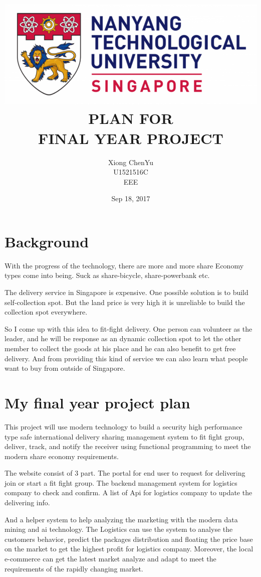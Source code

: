 \documentclass[setspace, doublespace]{scrartcl}
\author{Xiong ChenYu \\
U1521516C \\
EEE \\
}
\date{Sep 18, 2017 \\
}
\title{\includegraphics[width=\textwidth]{img/NTU.png} \\
[3\baselineskip] PLAN FOR\\
FINAL YEAR PROJECT \\
[6\baselineskip]}
\begin{document}
\maketitle
\tableofcontents

\listoffigures

\usepackage{indentfirst}
\newpage
\section{Background}
\label{sec:org095b14e}

With the progress of the technology, there are more and more share Economy types come into being.
Suck as share-bicycle, share-powerbank etc.

The delivery service in Singapore is expensive. One possible solution is to build self-collection spot.
But the land price is very high it is unreliable to build the collection spot everywhere.

So I come up with this idea to fit-fight delivery. One person can volunteer as the leader,
and he will be response as an dynamic collection spot to let the other member to collect the
goods at his place and he can also benefit to get free delivery.
And from providing this kind of service we can also learn what people want to buy from
outside of Singapore.

\section{My final year project plan}
\label{sec:org8d82581}
This project will use modern technology to build a security high performance type safe international delivery sharing management system to fit fight group, deliver, track, and notify the receiver using functional programming to meet the modern share economy requirements.

The website consist of 3 part. The portal for end user to request for delivering join or start a fit fight group. The backend management system for logistics company to check and confirm. A list of Api for logistics company to update the delivering info.

And a helper system to help analyzing the marketing with the modern data mining and ai technology. The Logistics can use the system to analyse the customers behavior, predict the packages distribution and floating the price base on the market to get the highest profit for logistics company. Moreover, the local e-commerce can get the latest market analyze and adapt to meet the requirements of the rapidly changing market.
\end{document}
